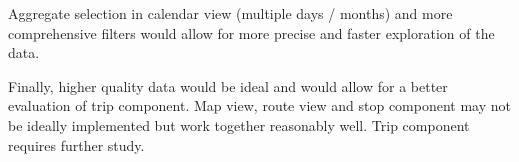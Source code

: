 \documentclass[journal]{vgtc}                %
\begin{document}
Aggregate selection in calendar view (multiple days / months) and more comprehensive filters would allow for more precise and faster exploration of the data.

Finally, higher quality data would be ideal and would allow for a better evaluation of trip component. Map view, route view and stop component may not be ideally implemented but work together reasonably well. Trip component requires further study.





\end{document}
